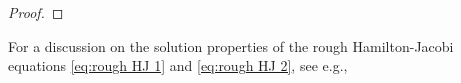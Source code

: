 \documentclass[11pt, oneside]{article}
\numberwithin{equation}{section}
\theoremstyle{definition}
\newcommand{\wt}[1]{\widetilde{#1}}
\newcommand{\mc}[1]{\mathcal{#1}}
\newcommand{\mcal}[1]{\mc{#1}}
\newcommand{\scp}[2]{{\left\langle {#1}\, , \, {#2}\right\rangle}}
\def\p{{\partial}}
\def\p{\partial}
\begin{document}
\begin{proof}
\end{proof}
For a discussion on the solution properties of the rough Hamilton-Jacobi equations \eqref{eq:rough HJ 1} and \eqref{eq:rough HJ 2}, see e.g., \cite{Friz2017}
\end{document}
